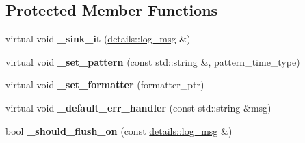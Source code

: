 \subsection*{Protected Member Functions}
\begin{DoxyCompactItemize}
\item 
virtual void {\bfseries \+\_\+sink\+\_\+it} (\hyperlink{structspdlog_1_1details_1_1log__msg}{details\+::log\+\_\+msg} \&)\hypertarget{classspdlog_1_1logger_ace111ec67a09bca55fa8f73233b79b08}{}\label{classspdlog_1_1logger_ace111ec67a09bca55fa8f73233b79b08}

\item 
virtual void {\bfseries \+\_\+set\+\_\+pattern} (const std\+::string \&, pattern\+\_\+time\+\_\+type)\hypertarget{classspdlog_1_1logger_a1bdb98068fca139a50a167894bc7fcd0}{}\label{classspdlog_1_1logger_a1bdb98068fca139a50a167894bc7fcd0}

\item 
virtual void {\bfseries \+\_\+set\+\_\+formatter} (formatter\+\_\+ptr)\hypertarget{classspdlog_1_1logger_addb8fd1eec5a87bcfa8cec1ab32aa375}{}\label{classspdlog_1_1logger_addb8fd1eec5a87bcfa8cec1ab32aa375}

\item 
virtual void {\bfseries \+\_\+default\+\_\+err\+\_\+handler} (const std\+::string \&msg)\hypertarget{classspdlog_1_1logger_a3a4a00fbf7e739dcd162ef4a5a98fb56}{}\label{classspdlog_1_1logger_a3a4a00fbf7e739dcd162ef4a5a98fb56}

\item 
bool {\bfseries \+\_\+should\+\_\+flush\+\_\+on} (const \hyperlink{structspdlog_1_1details_1_1log__msg}{details\+::log\+\_\+msg} \&)\hypertarget{classspdlog_1_1logger_ab6905b5e7a19a319d65682bdc859373a}{}\label{classspdlog_1_1logger_ab6905b5e7a19a319d65682bdc859373a}

\end{DoxyCompactItemize}
